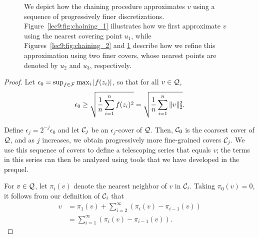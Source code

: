 \begin{figure}[ht!]
\begin{subfigure}[t]{0.45\textwidth}
        \caption{}
        \label{lec9:fig:chaining_3}
    \end{subfigure}
    \caption{We depict how the chaining procedure approximates $v$ using a sequence of progressively finer discretizations. Figure~\ref{lec9:fig:chaining_1} illustrates how we first approximate $v$ using the nearest covering point $u_1$, while Figures~\ref{lec9:fig:chaining_2} and \ref{lec9:fig:chaining_3} describe how we refine this approximation using two finer covers, whose nearest points are denoted by $u_2$ and $u_3$, respectively.}
    \label{lec9:fig:chaining_diag}
\end{figure}

\begin{proof} 
    Let $\epsilon_0 = \sup_{f\in \mathcal F} \max_i \left\lvert f(z_i)\right\rvert$, so that for all $v \in \mathcal Q$,
    \begin{equation}
        \epsilon_0 \ge \sqrt{\frac 1 n \sum_{i=1}^nf(z_i)^2}  = \sqrt{\frac 1 n \sum_{i=1}^n \|v\|_2^2}.
    \end{equation}
    
    Define $\epsilon_j = 2^{-j}\epsilon_0$ and let $\mathcal C_j$ be an $\epsilon_j$-cover of $\mathcal Q$. Then, $\mathcal C_0$ is the coarsest cover of $\mathcal Q$, and as $j$ increases, we obtain progressively more fine-grained covers $\mathcal C_j$. We use this sequence of covers to define a telescoping series that equals $v$; the terms in this series can then be analyzed using tools that we have developed in the prequel. 
    
    For $v \in \mathcal Q$, let $\pi_i(v)$ denote the nearest neighbor of $v$ in $\mathcal C_i$. 
    Taking $\pi_0(v) = 0$, it follows from our definition of $\mathcal C_i$ that
    \begin{align}
        v &= \pi_1(v) + \sum_{i = 2}^\infty (\pi_i(v) - \pi_{i - 1}(v)) \\
        &= \sum_{i = 1}^\infty (\pi_i(v) - \pi_{i - 1}(v)). \label{lec9:eqn:telescope_chain}
    \end{align}
    

\end{proof}
